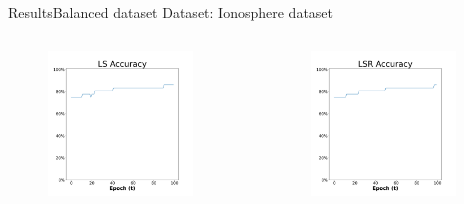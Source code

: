 \documentclass[
	aspectratio=169,	%
	onlytextwidth,		%
	t,					%
	]{beamer}
\begin{document}
	\begin{frame}[fragile]{Results}{Balanced dataset}
		\scriptsize
		Dataset: Ionosphere dataset~\cite{ion} 
		\newline
		\begin{columns}
			
				\begin{column}[T]{0.33\textwidth}
						\begin{figure}
					\includegraphics[width=0.9\textwidth]{myfigs/LS_b_res.png}
				\end{figure}
			\end{column}
		
			\begin{column}[T]{0.33\textwidth}
					\begin{figure}
					\includegraphics[width=0.9\textwidth]{myfigs/LSR_b_res.png}
				\end{figure}
			\end{column}
		

\end{columns}
\end{frame}
\end{document}
